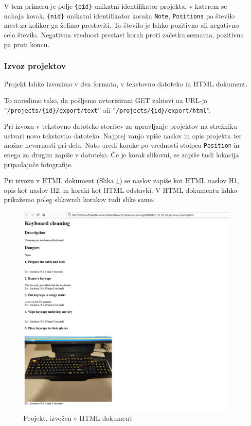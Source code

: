 \documentclass[a4paper, 12pt]{book}
\begin{document}
V tem primeru je polje \texttt{\{pid\}} unikatni identifikator projekta, v katerem se nahaja korak, \texttt{\{nid\}} unikatni identifikator koraka \texttt{Note}, \texttt{Positions} pa število mest za kolikor ga želimo prestaviti.
To število je lahko pozitivno ali negativno celo število.
Negativna vrednost prestavi korak proti začetku seznama, pozitivna pa proti koncu.

\subsubsection{Izvoz projektov}

Projekt lahko izvozimo v dva formata, v tekstovno datoteko in HTML dokument.

To naredimo tako, da pošljemo avtorizirani GET zahtevi na URL-ja ''\texttt{/projects/\{id\}/export/text}'' ali ''\texttt{/projects/\{id\}/export/html}''.

Pri izvozu v tekstovno datoteko storitev za upravljanje projektov na strežniku ustvari novo tekstovno datoteko.
Najprej vanjo vpiše naslov in opis projekta ter možne nevarnosti pri delu.
Nato uredi korake po vrednosti stolpca \texttt{Position} in enega za drugim zapiše v datoteko.
Če je korak slikovni, se zapiše tudi lokacija pripadajoče fotografije.

Pri izvozu v HTML dokument (Slika \ref{export_html}) se naslov zapiše kot HTML naslov H1, opis kot naslov H2, in koraki kot HTML odstavki.
V HTML dokumentu lahko prikažemo poleg slikovnih korakov tudi slike same.

\begin{figure}[H]
\begin{center}
\includegraphics[width=13cm]{export_html}
\end{center}
\caption{Projekt, izvožen v HTML dokument}
\label{export_html}
\end{figure}
\end{document}
